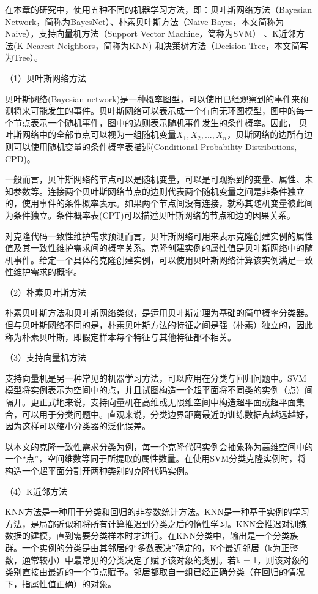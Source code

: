 在本章的研究中，使用五种不同的机器学习方法，即：贝叶斯网络方法（Bayesian Network，简称为BayesNet）\cite{friedman1997bayesian,pearl1985bayesian}、朴素贝叶斯方法（Naive Bayes，本文简称为Naive）\cite{john1995estimating}，支持向量机方法（Support Vector Machine，简称为SVM）\cite{platt199912} 、K近邻方法(K-Nearest Neighbors，简称为KNN) \cite{aha1991instance}和决策树方法（Decision Tree，本文简写为Tree）\cite{quinlan2014c4}。

（1）贝叶斯网络方法

贝叶斯网络(Bayesian network)是一种概率图型，可以使用已经观察到的事件来预测将来可能发生的事件\cite{friedman1997bayesian}。贝叶斯网络可以表示成一个有向无环图模型，图中的每一个节点表示一个随机事件，图中的边则表示随机事件发生的条件概率。因此， 贝叶斯网络中的全部节点可以视为一组随机变量{$X_{1},X_{2},...,X_{n}$}，贝斯网络的边所有边则可以使用随机变量的条件概率表描述(Conditional Probability Distributions, CPD)。

一般而言，贝叶斯网络的节点可以是随机变量，可以是可观察到的变量、属性、未知参数等。连接两个贝叶斯网络节点的边则代表两个随机变量之间是非条件独立的，使用事件的条件概率表示。如果两个节点间没有连接，就称其随机变量彼此间为条件独立。条件概率表(CPT)可以描述贝叶斯网络的节点和边的因果关系。

对克隆代码一致性维护需求预测而言，贝叶斯网络可用来表示克隆创建实例的属性值及其一致性维护需求间的概率关系。克隆创建实例的属性值是贝叶斯网络中的随机事件。给定一个具体的克隆创建实例，可以使用贝叶斯网络计算该实例满足一致性维护需求的概率。

（2）朴素贝叶斯方法

朴素贝叶斯方法和贝叶斯网络类似，是运用贝叶斯定理为基础的简单概率分类器。但与贝叶斯网络不同的是，朴素贝叶斯方法的特征之间是强（朴素）独立的，因此称为朴素贝叶斯，即假定样本每个特征与其他特征都不相关。 

（3）支持向量机方法

支持向量机是另一种常见的机器学习方法，可以应用在分类与回归问题中。SVM模型将实例表示为空间中的点，并且试图构造一个超平面将不同类的实例（点）间隔开。更正式地来说，支持向量机在高维或无限维空间中构造超平面或超平面集合，可以用于分类问题中。直观来说，分类边界距离最近的训练数据点越远越好，因为这样可以缩小分类器的泛化误差。

以本文的克隆一致性需求分类为例，每一个克隆代码实例会抽象称为高维空间中的一个“点”，空间维数等同于所提取的属性数量。在使用SVM分类克隆实例时，将构造一个超平面分割开两种类别的克隆代码实例。

（4）K近邻方法

KNN方法是一种用于分类和回归的非参数统计方法。KNN是一种基于实例的学习方法，是局部近似和将所有计算推迟到分类之后的惰性学习。KNN会推迟对训练数据的建模，直到需要分类样本时才进行。在KNN分类中，输出是一个分类族群。一个实例的分类是由其邻居的“多数表决”确定的，K个最近邻居（k为正整数，通常较小）中最常见的分类决定了赋予该对象的类别。若k = 1，则该对象的类别直接由最近的一个节点赋予。邻居都取自一组已经正确分类（在回归的情况下，指属性值正确）的对象。


